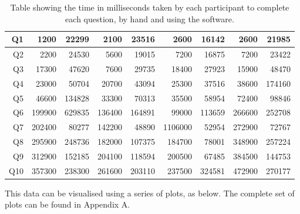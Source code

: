 \documentclass[12pt,twoside,notitlepage,xetex]{report}
\begin{document}
\begin{center}
\begin{table}[H]
\begin{center}
\begin{tabular}{|r||r|r||r|r||r|r||r|r|}
Q1 & 1200 & 22299 & 2100 & 23516 & 2600 & 16142 & 2600 & 21985\\ \hline
Q2 & 2200 & 24530 & 5600 & 19015 & 7200 & 16875 & 7200 & 23422\\ \hline
Q3 & 17300 & 47620 & 7600 & 29735 & 18400 & 27923 & 15900 & 48470\\ \hline
Q4 & 23000 & 50704 & 20700 & 43094 & 25300 & 37516 & 38600 & 174160\\ \hline
Q5 & 46600 & 134828 & 33300 & 70313 & 35500 & 58954 & 72400 & 98846\\ \hline
Q6 & 199900 & 629835 & 136400 & 164891 & 99000 & 113659 & 266600 & 252708\\ \hline
Q7 & 202400 & 80277 & 142200 & 48890 & 1106000 & 52954 & 272900 & 72767\\ \hline
Q8 & 295900 & 248736 & 182000 & 107375 & 184700 & 78001 & 348900 & 257224\\ \hline
Q9 & 312900 & 152185 & 204100 & 118594 & 200500 & 67485 & 384500 & 144753\\ \hline
Q10 & 357300 & 238300 & 261600 & 203110 & 237500 & 324581 & 472900 & 270177\\
\hline
\end{tabular}
\end{center}
\caption{Table showing the time in milliseconds taken by each participant to complete each question, by hand and using the software.}
\label{tab:BigTimes}
\end{table}
\end{center}

This data can be visualised using a series of plots, as below.  The complete set of plots can be found in Appendix A.
\end{document}
